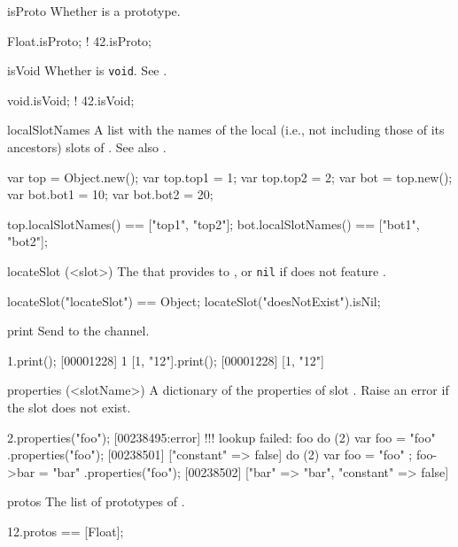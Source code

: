 \begin{urbiscriptapi}
\item[isProto]%
  Whether \this is a prototype.
\begin{urbiassert}
 Float.isProto;
!   42.isProto;
\end{urbiassert}


\item[isVoid]%
  Whether \this is \lstinline|void|.  See .
\begin{urbiassert}
void.isVoid;
! 42.isVoid;
\end{urbiassert}


\item[localSlotNames]%
  A list with the names of the local (i.e., not including those of its
  ancestors) slots of \this.  See also .
\begin{urbiassert}
var top = Object.new();
var top.top1 = 1;
var top.top2 = 2;
var bot = top.new();
var bot.bot1 = 10;
var bot.bot2 = 20;

top.localSlotNames() == ["top1", "top2"];
bot.localSlotNames() == ["bot1", "bot2"];
\end{urbiassert}


\item[locateSlot](<slot>)%
  The  that provides  to \this, or \lstinline|nil| if
  \this does not feature .
\begin{urbiassert}
locateSlot("locateSlot") == Object;
locateSlot("doesNotExist").isNil;
\end{urbiassert}


\item[print] Send \this to the  channel.
\begin{urbiscript}
1.print();
[00001228] 1
[1, "12"].print();
[00001228] [1, "12"]
\end{urbiscript}


\item[properties](<slotName>)%
  A dictionary of the properties of slot .  Raise an error if
  the slot does not exist.
\begin{urbiscript}
2.properties("foo");
[00238495:error] !!! lookup failed: foo
do (2) { var foo = "foo" }.properties("foo");
[00238501] ["constant" => false]
do (2) { var foo = "foo" ; foo->bar = "bar" }.properties("foo");
[00238502] ["bar" => "bar", "constant" => false]
\end{urbiscript}


\item[protos]
  The list of prototypes of \this.
\begin{urbiassert}
12.protos == [Float];
\end{urbiassert}



\end{urbiscriptapi}
